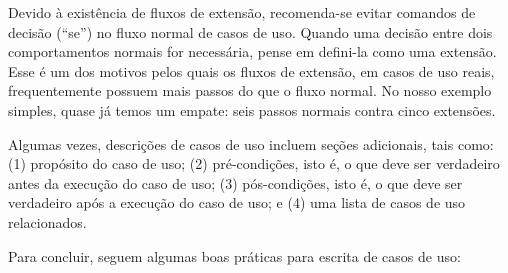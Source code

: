 \documentclass[
  11pt,
  twoside]{book}
\begin{document}
Devido à existência de fluxos de extensão, recomenda-se evitar comandos
de decisão (``se'') no fluxo normal de casos de uso. Quando uma decisão
entre dois comportamentos normais for necessária, pense em defini-la
como uma extensão. Esse é um dos motivos pelos quais os fluxos de
extensão, em casos de uso reais, frequentemente possuem mais passos do
que o fluxo normal. No nosso exemplo simples, quase já temos um empate:
seis passos normais contra cinco extensões.

Algumas vezes, descrições de casos de uso incluem seções adicionais,
tais como: (1) propósito do caso de uso; (2) pré-condições, isto é, o
que deve ser verdadeiro antes da execução do caso de uso; (3)
pós-condições, isto é, o que deve ser verdadeiro após a execução do caso
de uso; e (4) uma lista de casos de uso relacionados.

Para concluir, seguem algumas boas práticas para escrita de casos de
uso:
\end{document}
